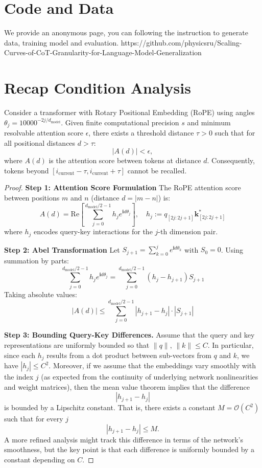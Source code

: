 \section{Code and Data}
We provide an anonymous page, you can following the instruction to generate data, training model and evaluation.
https://github.com/physicsru/Scaling-Curves-of-CoT-Granularity-for-Language-Model-Generalization

\section{Recap Condition Analysis}

\begin{theorem}
\label{thm: Recap 1}
Consider a transformer with Rotary Positional Embedding (RoPE) using angles $\theta_j = 10000^{-2j/d_{\text{model}}}$. Given finite computational precision $s$ and minimum resolvable attention score $\epsilon$, there exists a threshold distance $\tau > 0$ such that for all positional distances $d > \tau$:
\[
|A(d)| < \epsilon,
\]
where $A(d)$ is the attention score between tokens at distance $d$. Consequently, tokens beyond $[i_{\text{current}} - \tau, i_{\text{current}} + \tau]$ cannot be recalled.

\begin{proof}
\textbf{Step 1: Attention Score Formulation}  
The RoPE attention score between positions $m$ and $n$ (distance $d = |m-n|$) is:
\[
A(d) = \text{Re}\left[\sum_{j=0}^{d_{\text{model}}/2-1} h_j e^{\mathbf{i}d\theta_j}\right], \quad h_j := q_{[2j:2j+1]}\mathbf{k}^*_{[2j:2j+1]}
\]
where $h_j$ encodes query-key interactions for the $j$-th dimension pair.

\textbf{Step 2: Abel Transformation\cite{men2024baseropeboundscontext}}  
Let $S_{j+1} = \sum_{k=0}^j e^{\mathbf{i}d\theta_k}$ with $S_0 = 0$. Using summation by parts:
\[
\sum_{j=0}^{d_{\text{model}}/2-1} h_j e^{\mathbf{i}d\theta_j} = \sum_{j=0}^{d_{\text{model}}/2-1} (h_j - h_{j+1}) S_{j+1}
\]
Taking absolute values:
\[
|A(d)| \leq \sum_{j=0}^{d_{\text{model}}/2-1} |h_{j+1} - h_j| \cdot |S_{j+1}|
\]

\bigskip
\textbf{Step 3: Bounding Query-Key Differences.}  
Assume that the query and key representations are uniformly bounded so that $\|q\|,\,\|k\| \le C$. In particular, since each $h_j$ results from a dot product between sub-vectors from $q$ and $k$, we have $|h_j| \le C^2$. Moreover, if we assume that the embeddings vary smoothly with the index $j$ (as expected from the continuity of underlying network nonlinearities and weight matrices), then the mean value theorem implies that the difference
\[
|h_{j+1} - h_j|
\]
is bounded by a Lipschitz constant. That is, there exists a constant $M = \mathcal{O}(C^2)$ such that for every $j$
\[
|h_{j+1} - h_j| \le M.
\]
A more refined analysis might track this difference in terms of the network’s smoothness, but the key point is that each difference is uniformly bounded by a constant depending on $C$.


\end{proof}
\end{theorem}
